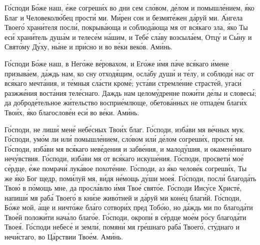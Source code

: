 \begin{mymulticols}

Г\'{о}споди Б\'{о}же наш, \'{е}же согреш\'{и}х во дни сем сл\'{о}вом, д\'{е}лом и помышл\'{е}нием, \'{я}ко Благ и Человекол\'{ю}бец прост\'{и} ми. М\'{и}рен сон и безмят\'{е}жен д\'{а}руй ми. \'{А}нгела Твоег\'{о} хран\'{и}теля посл\'{и}, покрыв\'{а}юща и соблюд\'{а}юща мя от вс\'{я}каго зла, \'{я}ко Ты ес\'{и} хран\'{и}тель душ\'{а}м и телес\'{е}м н\'{а}шим, и Теб\'{е} сл\'{а}ву возсыл\'{а}ем, Отц\'{у} и С\'{ы}ну и Свят\'{о}му Д\'{у}ху, н\'{ы}не и пр\'{и}сно и во в\'{е}ки век\'{о}в. Ам\'{и}нь.


Г\'{о}споди Б\'{о}же наш, в Нег\'{о}же в\'{е}ровахом, и Ег\'{о}же \'{и}мя п\'{а}че вс\'{я}каго \'{и}мене призыв\'{а}ем, д\'{а}ждь нам, ко сну отход\'{я}щим, осл\'{а}бу душ\'{и} и т\'{е}лу, и соблюд\'{и} нас от вс\'{я}каго мечт\'{а}ния, и т\'{е}мныя сл\'{а}сти кром\'{е}; уст\'{а}ви стремл\'{е}ние страст\'{е}й, угас\'{и} разжж\'{е}ния вост\'{а}ния тел\'{е}снаго. Даждь нам целом\'{у}дренне пож\'{и}ти д\'{е}лы и словес\'{ы}; да доброд\'{е}тельное ж\'{и}тельство воспри\'{е}млюще, обетов\'{а}нных не отпад\'{е}м благ\'{и}х Тво\'{и}х, \'{я}ко благослов\'{е}н ес\'{и} во в\'{е}ки. Ам\'{и}нь.


Г\'{о}споди, не лиш\'{и} мен\'{е} неб\'{е}сных Тво\'{и}х благ.
Г\'{о}споди, изб\'{а}ви мя в\'{е}чных мук.
Г\'{о}споди, ум\'{о}м ли ил\'{и} помышл\'{е}нием, сл\'{о}вом ил\'{и} д\'{е}лом согреш\'{и}х, прост\'{и} мя.
Г\'{о}споди, изб\'{а}ви мя вс\'{я}каго нев\'{е}дения и забв\'{е}ния, и малод\'{у}шия, и окамен\'{е}ннаго неч\'{у}вствия.
Г\'{о}споди, изб\'{а}ви мя от вс\'{я}каго искуш\'{е}ния.
Г\'{о}споди, просвет\'{и} мо\'{е} с\'{е}рдце, \'{е}же помрач\'{и} лук\'{а}вое похот\'{е}ние.
Г\'{о}споди, аз \'{я}ко челов\'{е}к согреш\'{и}х, Ты же \'{я}ко Бог щедр, пом\'{и}луй мя, в\'{и}дя н\'{е}мощь д\'{у}ши мое\'{я}.
Г\'{о}споди, посл\'{и} благод\'{а}ть Тво\'{ю} в п\'{о}мощь мне, да просл\'{а}влю \'{и}мя Тво\'{е} свят\'{о}е.
Г\'{о}споди Иис\'{у}се Христ\'{е}, напиш\'{и} мя раб\'{а} Твоег\'{о} в кн\'{и}зе жив\'{о}тней и д\'{а}руй ми кон\'{е}ц благ\'{и}й.
Г\'{о}споди, Б\'{о}же мой, \'{а}ще и ничт\'{о}же бл\'{а}го сотвор\'{и}х пред Тоб\'{о}ю, но д\'{а}ждь ми по благод\'{а}ти Тво\'{е}й полож\'{и}ти нач\'{а}ло благ\'{о}е.
Г\'{о}споди, окроп\'{и} в с\'{е}рдце мо\'{е}м р\'{о}су благод\'{а}ти Твое\'{я}.
Г\'{о}споди небес\'{е} и земл\'{и}, помян\'{и} мя гр\'{е}шнаго раб\'{а} Твоег\'{о}, ст\'{у}днаго и неч\'{и}стаго, во Ц\'{а}рствии Тво\'{е}м. Ам\'{и}нь.


\end{mymulticols}
